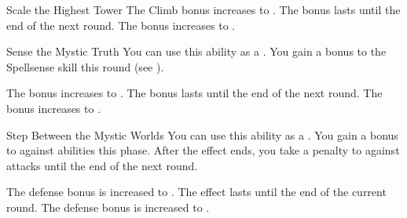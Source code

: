 {\begin{durationability}{Scale the Highest Tower}
                \rankline
                 The Climb bonus increases to .
                 The bonus lasts until the end of the next round.
                 The bonus increases to .
            \end{durationability}

            \begin{durationability}{Sense the Mystic Truth}
                \rankline
                You can use this ability as a .
                You gain a  bonus to the Spellsense skill this round (see ).

                \rankline
                 The bonus increases to .
                 The bonus lasts until the end of the next round.
                 The bonus increases to .
            \end{durationability}

            \begin{durationability}{Step Between the Mystic Worlds}
                \rankline
                You can use this ability as a .
                You gain a  bonus to  against  abilities this phase.
                After the effect ends, you take a  penalty to  against  attacks until the end of the next round.

                \rankline
                 The defense bonus is increased to .
                 The effect lasts until the end of the current round.
                 The defense bonus is increased to .
            \end{durationability}



        }

